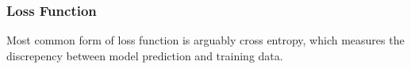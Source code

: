 \subsubsection{Loss Function}

Most common form of loss function is arguably cross entropy, which measures the discrepency between model prediction and training data.